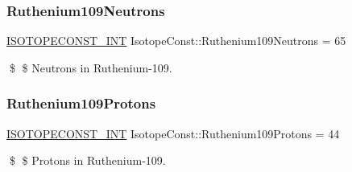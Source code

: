 \subsubsection{\texorpdfstring{Ruthenium109\+Neutrons}{Ruthenium109Neutrons}}
{\footnotesize\ttfamily \mbox{\hyperlink{group___isotope_const-_macros_ga5f18360b3e99483a35c32d789e62621c}{I\+S\+O\+T\+O\+P\+E\+C\+O\+N\+S\+T\+\_\+\+I\+NT}} Isotope\+Const\+::\+Ruthenium109\+Neutrons = 65}

\$ \$ Neutrons in Ruthenium-\/109. \mbox{\label{group___isotope_const-_ruthenium-_ru109_ga0b5f743c15d16c25f1a87c996a84d3a6}} 
\subsubsection{\texorpdfstring{Ruthenium109\+Protons}{Ruthenium109Protons}}
{\footnotesize\ttfamily \mbox{\hyperlink{group___isotope_const-_macros_ga5f18360b3e99483a35c32d789e62621c}{I\+S\+O\+T\+O\+P\+E\+C\+O\+N\+S\+T\+\_\+\+I\+NT}} Isotope\+Const\+::\+Ruthenium109\+Protons = 44}

\$ \$ Protons in Ruthenium-\/109. 